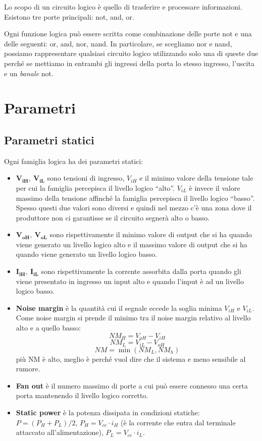 \documentclass[
]{book}
\providecommand{\tightlist}{%
  \setlength{\itemsep}{0pt}\setlength{\parskip}{0pt}}
\begin{document}
Lo scopo di un circuito logico è quello di trasferire e processare
informazioni. Esistono tre porte principali: not, and, or.

Ogni funzione logica può essere scritta come combinazione delle porte
not e una delle seguenti: or, and, nor, nand. In particolare, se
scegliamo nor e nand, possiamo rappresentare qualsiasi circuito logico
utilizzando solo una di queste due perché se mettiamo in entrambi gli
ingressi della porta lo stesso ingresso, l'uscita e un \emph{banale}
not.

\section{Parametri}\label{parametri}

\subsection{Parametri statici}\label{parametri-statici}

Ogni famiglia logica ha dei parametri statici:

\begin{itemize}
\tightlist
\item
  \(\mathbf{V_{iH}},\ \mathbf{V_{iL}}\) sono tensioni di ingresso,
  \(V_{iH}\) e il minimo valore della tensione tale per cui la famiglia
  percepisca il livello logico ``alto''. \(V_{iL}\) è invece il valore
  massimo della tensione affinché la famiglia percepisca il livello
  logico ``basso''. Spesso questi due valori sono diversi e quindi nel
  mezzo c'è una zona dove il produttore non ci garantisse se il circuito
  segnerà alto o basso.
\item
  \(\mathbf{V_{oH}},\ \mathbf{V_{oL}}\) sono rispettivamente il minimo
  valore di output che si ha quando viene generato un livello logico
  alto e il massimo valore di output che si ha quando viene generato un
  livello logico basso.
\item
  \(\mathbf{I_{iH}},\ \mathbf{I_{iL}}\) sono rispettivamente la corrente
  assorbita dalla porta quando gli viene presentato in ingresso un input
  alto e quando l'input è ad un livello logico basso.\\
\item
  \textbf{Noise margin} è la quantità cui il segnale eccede la soglia
  minima \(V_{iH}\) e \(V_{iL}\). Come noise margin si prende il minimo
  tra il noise margin relativo al livello alto e a quello basso:
  \[NM_{H} =V_{oH}-V_{iH}\] \[NM_{L} =V_{iL}-V_{oH}\]
  \[NM =\min(NM_{L},NM_{h})\] più NM è alto, meglio è perché vuol dire
  che il sistema e meno sensibile al rumore.\\
\item
  \textbf{Fan out} è il numero massimo di porte a cui può essere
  connesso una certa porta mantenendo il livello logico corretto.\\
\item
  \textbf{Static power} è la potenza dissipata in condizioni statiche:
  \(P=(P_{H}+P_{L})/2\), \(P_{H}=V_{cc}\cdot i_{H}\) (è la corrente che
  entra dal terminale attaccato all'alimentazione),
  \(P_{L}=V_{cc}\cdot i_{L}\).
\end{itemize}
\end{document}
